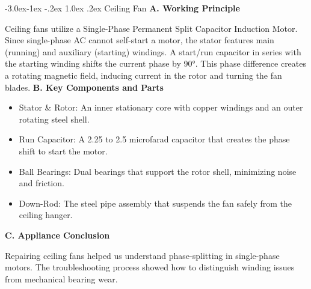 \documentclass[11pt,a4paper]{report}
\makeatletter
\renewcommand{\subsection}{\@startsection{subsection}{2}{\z@}%
  {-3.0ex\@plus -1ex \@minus -.2ex}%
  {1.0ex \@plus .2ex}%
  {\normalfont\large\bfseries\color{secondaryColor}}}
\makeatother
\begin{document}
\subsection{Ceiling Fan}
\noindent\textbf{A. Working Principle}\par\medskip
Ceiling fans utilize a Single-Phase Permanent Split Capacitor Induction Motor. Since single-phase AC cannot self-start a motor, the stator features main (running) and auxiliary (starting) windings. A start/run capacitor in series with the starting winding shifts the current phase by 90°. This phase difference creates a rotating magnetic field, inducing current in the rotor and turning the fan blades.
\noindent\textbf{B. Key Components and Parts}\par\medskip
\begin{itemize}
  \item Stator \& Rotor: An inner stationary core with copper windings and an outer rotating steel shell.
  \item Run Capacitor: A 2.25 to 2.5 microfarad capacitor that creates the phase shift to start the motor.
  \item Ball Bearings: Dual bearings that support the rotor shell, minimizing noise and friction.
  \item Down-Rod: The steel pipe assembly that suspends the fan safely from the ceiling hanger.
\end{itemize}
\noindent\textbf{C. Appliance Conclusion}\par\medskip
Repairing ceiling fans helped us understand phase-splitting in single-phase motors. The troubleshooting process showed how to distinguish winding issues from mechanical bearing wear.
\end{document}
